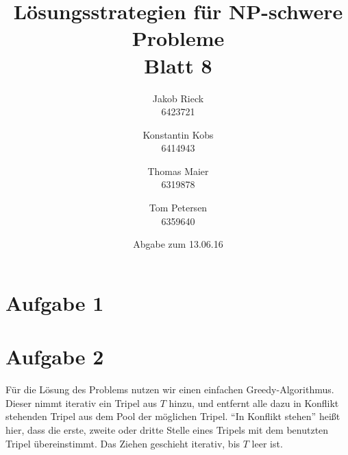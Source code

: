 \documentclass[12pt,a4paper]{article}
\title{Lösungsstrategien für NP-schwere Probleme\\Blatt 8}
\author{
		Jakob Rieck\\
		\small{6423721}
	\and
		Konstantin Kobs\\
		\small{6414943}
	\and
		Thomas Maier\\
		\small{6319878}
	\and
		Tom Petersen\\
		\small{6359640}
}
\date{Abgabe zum 13.06.16}
\begin{document}
\maketitle

\section*{Aufgabe 1}



\section*{Aufgabe 2}

Für die Lösung des Problems nutzen wir einen einfachen Greedy-Algorithmus. Dieser nimmt iterativ ein Tripel aus $T$ hinzu, und entfernt alle dazu in Konflikt stehenden Tripel aus dem Pool der möglichen Tripel. "`In Konflikt stehen"' heißt hier, dass die erste, zweite oder dritte Stelle eines Tripels mit dem benutzten Tripel übereinstimmt. Das Ziehen geschieht iterativ, bis $T$ leer ist. 
\end{document}
